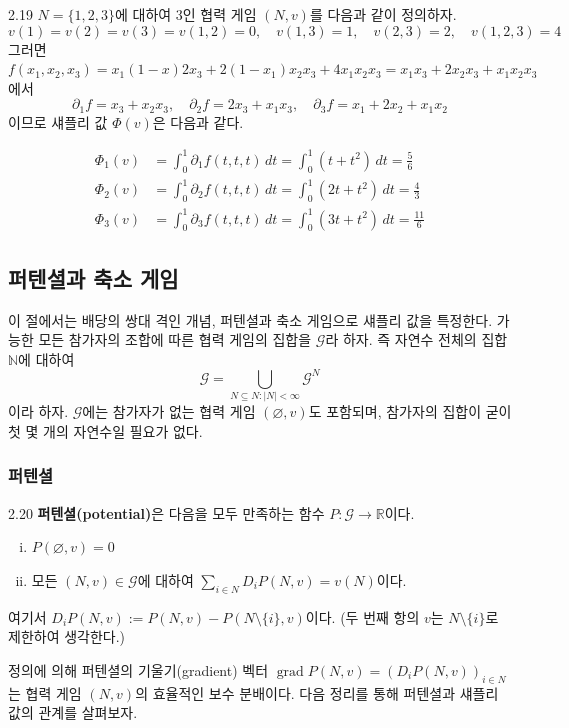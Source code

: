 \documentclass{article}
\numberwithin{equation}{section}
\begin{document}
\begin{example}{}{2.19}
	$N=\{1,2,3\}$에 대하여 $3$인 협력 게임 $(N,v)$를 다음과 같이 정의하자.
	\[
		v(1)=v(2)=v(3)=v(1,2)=0,\quad v(1,3)=1,\quad v(2,3)=2,\quad v(1,2,3)=4
	\]
	그러면 $f(x_1,x_2,x_3)=x_1(1-x)2x_3+2(1-x_1)x_2x_3+4x_1x_2x_3=x_1x_3+2x_2x_3+x_1x_2x_3$에서
	\[
		\partial_1f=x_3+x_2x_3,\quad\partial_2f=2x_3+x_1x_3,\quad\partial_3f=x_1+2x_2+x_1x_2
	\]
	이므로 섀플리 값 $\Phi(v)$은 다음과 같다.
	
	\[
		\begin{aligned}
			\Phi_1(v)&=\int_0^1\partial_1f(t,t,t)\,dt=\int_0^1(t+t^2)\,dt=\frac{5}{6}\\[3pt]
			\Phi_2(v)&=\int_0^1\partial_2f(t,t,t)\,dt=\int_0^1(2t+t^2)\,dt=\frac{4}{3}\\[3pt]
			\Phi_3(v)&=\int_0^1\partial_3f(t,t,t)\,dt=\int_0^1(3t+t^2)\,dt=\frac{11}{6}
		\end{aligned}
	\]
\end{example}

\subsection{퍼텐셜과 축소 게임}
이 절에서는 배당의 쌍대 격인 개념, 퍼텐셜과 축소 게임으로 섀플리 값을 특정한다. 가능한 모든 참가자의 조합에 따른 협력 게임의 집합을 $\mathcal G$라 하자. 즉 자연수 전체의 집합 $\mathbb N$에 대하여
\[
	\mathcal G=\bigcup_{N\subseteq N:\vert N\vert<\infty}\mathcal G^N
\]
이라 하자. $\mathcal G$에는 참가자가 없는 협력 게임 $(\varnothing, v)$도 포함되며, 참가자의 집합이 굳이 첫 몇 개의 자연수일 필요가 없다.

\subsubsection*{퍼텐셜}
\begin{dfn}{}{2.20}
	\textbf{퍼텐셜(potential)}은 다음을 모두 만족하는 함수 $P:\mathcal G\to\mathbb R$이다.
	\begin{enumerate}[(i)]
		\item $P(\varnothing,v)=0$
		\item 모든 $(N,v)\in\mathcal G$에 대하여 $\sum_{i\in N}D_iP(N,v)=v(N)$이다.
	\end{enumerate}
	여기서 $D_iP(N,v):=P(N,v)-P(N\setminus\{i\},v)$이다. (두 번째 항의 $v$는 $N\setminus\{i\}$로 제한하여 생각한다.)
\end{dfn}
정의에 의해 퍼텐셜의 기울기(gradient) 벡터 $\operatorname{grad}P(N,v)=(D_iP(N,v))_{i\in N}$는 협력 게임 $(N,v)$의 효율적인 보수 분배이다. 다음 정리를 통해 퍼텐셜과 섀플리 값의 관계를 살펴보자.
\end{document}
